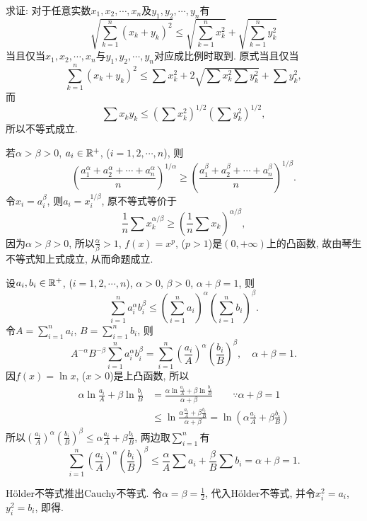 求证: 对于任意实数$x_{1},x_{2},\cdots,x_{n}$及$y_{1},y_{2},\cdots,y_{n}$有
\[
\sqrt{\sum_{k=1}^{n}\left(x_{k}+y_{k}\right)^{2}}\le\sqrt{\sum_{k=1}^{n}x_{k}^{2}}+\sqrt{\sum_{k=1}^{n}y_{k}^{2}}
\]
当且仅当$x_{1},x_{2},\cdots,x_{n}$与$y_{1},y_{2},\cdots,y_{n}$对应成比例时取到.
\eq
\ba
原式当且仅当
\[
\sum_{k=1}^{n}\left(x_{k}+y_{k}\right)^{2}\le\sum x_{k}^{2}+2\sqrt{\sum x_{k}^{2}\sum y_{k}^{2}}+\sum y_{k}^{2},
\]
而
\[
\sum x_{k}y_{k}\le\left(\sum x_{k}^{2}\right)^{1/2}\left(\sum y_{k}^{2}\right)^{1/2},
\]
所以不等式成立.
\ea

若$\alpha>\beta>0$, $a_{i}\in\mathbb{R}^{+}$, ($i=1,2,\cdots,n$), 则
\[
\left(\frac{a_{1}^{\alpha}+a_{2}^{\alpha}+\cdots+a_{n}^{\alpha}}{n}\right)^{1/\alpha}\ge\left(\frac{a_{1}^{\beta}+a_{2}^{\beta}+\cdots+a_{n}^{\beta}}{n}\right)^{1/\beta}.
\]
\eq
\ba
令$x_{i}=a_{i}^{\beta}$, 则$a_{i}=x_{i}^{1/\beta}$, 原不等式等价于
\[
\frac{1}{n}\sum x_{k}^{\alpha/\beta}\ge\left(\frac{1}{n}\sum x_{k}\right)^{\alpha/\beta},
\]
因为$\alpha>\beta>0$, 所以$\frac{\alpha}{\beta}>1$, $f\left(x\right)=x^{p}$,
($p>1$)是$\left(0,+\infty\right)$上的凸函数, 故由琴生不等式知上式成立, 从而命题成立.
\ea

设$a_{i},b_{i}\in\mathbb{R}^{+}$, ($i=1,2,\cdots,n$), $\alpha>0$, $\beta>0$,
$\alpha+\beta=1$, 则
\[
\sum_{i=1}^{n}a_{i}^{\alpha}b_{i}^{\beta}\le\left(\sum_{i=1}^{n}a_{i}\right)^{\alpha}\left(\sum_{i=1}^{n}b_{i}\right)^{\beta}.
\]
\eq
\ba
令$A=\sum_{i=1}^{n}a_{i}$, $B=\sum_{i=1}^{n}b_{i}$, 则
\[
A^{-\alpha}B^{-\beta}\sum_{i=1}^{n}a_{i}^{\alpha}b_{i}^{\beta}=\sum_{i=1}^{n}\left(\frac{a_{i}}{A}\right)^{\alpha}\left(\frac{b_{i}}{B}\right)^{\beta},\quad\alpha+\beta=1.
\]
因$f\left(x\right)=\ln x$, ($x>0$)是上凸函数, 所以
\[
\begin{aligned}\alpha\ln\frac{a_{i}}{A}+\beta\ln\frac{b_{i}}{B} & =\frac{\alpha\ln\frac{a_{i}}{A}+\beta\ln\frac{b_{i}}{B}}{\alpha+\beta}\qquad\because\alpha+\beta=1\\
 & \le\ln\frac{\alpha\frac{a_{i}}{A}+\beta\frac{b_{i}}{B}}{\alpha+\beta}=\ln\left(\alpha\frac{a_{i}}{A}+\beta\frac{b_{i}}{B}\right)
\end{aligned}
\]
所以$\left(\frac{a_{i}}{A}\right)^{\alpha}\left(\frac{b_{i}}{B}\right)^{\beta}\le\alpha\frac{a_{i}}{A}+\beta\frac{b_{i}}{B}$,
两边取$\sum_{i=1}^{n}$有
\[
\sum_{i=1}^{n}\left(\frac{a_{i}}{A}\right)^{\alpha}\left(\frac{b_{i}}{B}\right)^{\beta}\le\frac{\alpha}{A}\sum a_{i}+\frac{\beta}{B}\sum b_{i}=\alpha+\beta=1.
\]
\ea

\bq{}{}
H\"{o}lder不等式推出Cauchy不等式.
\eq
\ba
令$\alpha=\beta=\frac{1}{2}$, 代入H\"{o}lder不等式, 并令$x_{i}^{2}=a_{i}$,
$y_{i}^{2}=b_{i}$, 即得.
\ea


